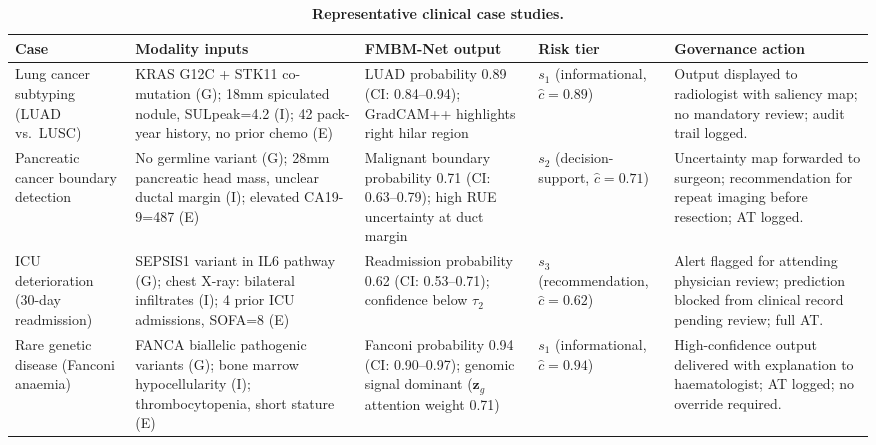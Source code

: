 \documentclass{ieeeaccess}
\begin{document}
\begin{table}[!t]
\caption{\textbf{Representative clinical case studies.}}
\label{tab:cases}
\centering
\renewcommand{\arraystretch}{1.25}
\setlength{\tabcolsep}{4pt}
\small
\begin{tabular}{p{1.7cm}p{3.6cm}p{3.6cm}p{1.6cm}p{3.7cm}}
\toprule
\textbf{Case} & \textbf{Modality inputs} & \textbf{FMBM-Net output} & \textbf{Risk tier} & \textbf{Governance action}\\
\midrule
Lung cancer subtyping (LUAD vs.\ LUSC)
  & KRAS G12C + STK11 co-mutation (G); 18mm spiculated nodule, SULpeak=4.2 (I); 42 pack-year history, no prior chemo (E)
  & LUAD probability 0.89 (CI: 0.84--0.94); GradCAM++ highlights right hilar region
  & $s_1$ (informational, $\hat{c}\!=\!0.89$)
  & Output displayed to radiologist with saliency map; no mandatory review; audit trail logged.\\
\midrule
Pancreatic cancer boundary detection
  & No germline variant (G); 28mm pancreatic head mass, unclear ductal margin (I); elevated CA19-9=487 (E)
  & Malignant boundary probability 0.71 (CI: 0.63--0.79); high RUE uncertainty at duct margin
  & $s_2$ (decision-support, $\hat{c}\!=\!0.71$)
  & Uncertainty map forwarded to surgeon; recommendation for repeat imaging before resection; AT logged.\\
\midrule
ICU deterioration (30-day readmission)
  & SEPSIS1 variant in IL6 pathway (G); chest X-ray: bilateral infiltrates (I); 4 prior ICU admissions, SOFA=8 (E)
  & Readmission probability 0.62 (CI: 0.53--0.71); confidence below $\tau_2$
  & $s_3$ (recommendation, $\hat{c}\!=\!0.62$)
  & Alert flagged for attending physician review; prediction blocked from clinical record pending review; full AT.\\
\midrule
Rare genetic disease (Fanconi anaemia)
  & FANCA biallelic pathogenic variants (G); bone marrow hypocellularity (I); thrombocytopenia, short stature (E)
  & Fanconi probability 0.94 (CI: 0.90--0.97); genomic signal dominant ($\mathbf{z}_g$ attention weight 0.71)
  & $s_1$ (informational, $\hat{c}\!=\!0.94$)
  & High-confidence output delivered with explanation to haematologist; AT logged; no override required.\\
\bottomrule
\end{tabular}
\end{table}
\end{document}

